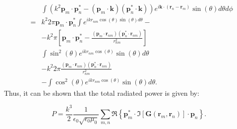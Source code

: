 \begin{eqnarray}
& &\int\left(k^2\mathbf{p}_{m}\cdot\mathbf{p}_{n}^{*}-\left(\mathbf{p}_{m}\cdot\mathbf{k}\right)\left(\mathbf{p}_{n}^{*}\cdot\mathbf{k}\right)\right)e^{i\mathbf{k}\cdot\left(\mathbf{r}_{n}-\mathbf{r}_{m}\right)}\sin\left(\theta\right)d\theta d\phi \\
& = & k^2 2\pi \mathbf{p}_{m}\cdot\mathbf{p}_{n}^{*}\int e^{ikr_{nm}\cos\left(\theta\right)\sin\left(\theta\right)d\theta}- \nonumber \\
& & -k^2 \pi \left[ \mathbf{p}_{m} \cdot \mathbf{p}_{n}^{*} - \frac{\left(\mathbf{p}_{m}\cdot\mathbf{r}_{nm}\right)\left(\mathbf{p}_{n}^{*}\cdot\mathbf{r}_{nm}\right)}{r^{2}_{nm}}\right] \nonumber\\
& & \int \sin^{2}\left(\theta\right)e^{ikr_{nm} \cos \left(\theta\right)}\sin \left(\theta\right) d\theta \nonumber \\
& & -k^{2} 2 \pi \frac{\left(\mathbf{p}_{m}\cdot\mathbf{r}_{nm}\right)\left(\mathbf{p}_{n}^{*}\cdot\mathbf{r}_{nm}\right)}{r^{2}_{nm}} \nonumber \\
& & - \int \cos^{2}\left(\theta\right)e^{ikr_{nm} \cos \left(\theta\right)}\sin \left(\theta\right) d\theta.
\end{eqnarray}
Thus, it can be shown that the total radiated power is given by:

\begin{equation}
P = \frac{k^3}{2}\frac{1}{\epsilon_{0}\sqrt{\epsilon_{0} \mu_{0}}} \sum_{m,n}\Re \left\{ \mathbf{p}_{m}^{*}\cdot \Im \left[ \mathbf{G} \left(\mathbf{r}_{m},\mathbf{r}_{n}\right)\right]\cdot \mathbf{p}_{n} \right\}.
\end{equation}




